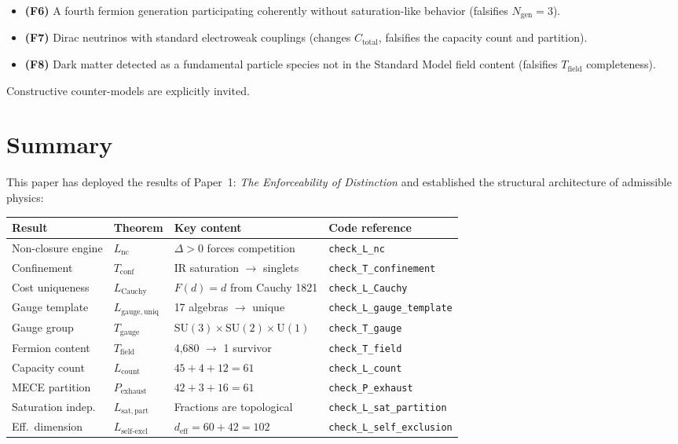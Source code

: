 \documentclass[11pt]{article}
\newenvironment{varlist}{\begin{itemize}[nosep,leftmargin=2em]}{\end{itemize}}
\newcommand{\SU}{\mathrm{SU}}
\newcommand{\U}{\mathrm{U}}
\begin{document}
\begin{varlist}
\item \textbf{(F6)} A fourth fermion generation participating coherently without saturation-like behavior (falsifies $N_{\mathrm{gen}} = 3$).
\item \textbf{(F7)} Dirac neutrinos with standard electroweak couplings (changes $C_{\mathrm{total}}$, falsifies the capacity count and partition).
\item \textbf{(F8)} Dark matter detected as a fundamental particle species not in the Standard Model field content (falsifies $T_{\mathrm{field}}$ completeness).
\end{varlist}

Constructive counter-models are explicitly invited.


\section{Summary}
\label{sec:summary}

This paper has deployed the results of Paper~1: \emph{The Enforceability of Distinction} and established the structural architecture of admissible physics:

\begin{center}
\footnotesize
\begin{tabular}{lp{2.8cm}p{4.2cm}l}
\toprule
\textbf{Result} & \textbf{Theorem} & \textbf{Key content} & \textbf{Code reference} \\
\midrule
Non-closure engine & $L_{\mathrm{nc}}$ & $\Delta > 0$ forces competition & \texttt{check\_L\_nc} \\
Confinement & $T_{\mathrm{conf}}$ & IR saturation $\to$ singlets & \texttt{check\_T\_confinement} \\
Cost uniqueness & $L_{\mathrm{Cauchy}}$ & $F(d) = d$ from Cauchy 1821 & \texttt{check\_L\_Cauchy} \\
Gauge template & $L_{\mathrm{gauge,uniq}}$ & 17 algebras $\to$ unique & \texttt{check\_L\_gauge\_template} \\
Gauge group & $T_{\mathrm{gauge}}$ & $\SU(3) \!\times\! \SU(2) \!\times\! \U(1)$ & \texttt{check\_T\_gauge} \\
Fermion content & $T_{\mathrm{field}}$ & 4{,}680 $\to$ 1 survivor & \texttt{check\_T\_field} \\
Capacity count & $L_{\mathrm{count}}$ & $45 + 4 + 12 = 61$ & \texttt{check\_L\_count} \\
MECE partition & $P_{\mathrm{exhaust}}$ & $42 + 3 + 16 = 61$ & \texttt{check\_P\_exhaust} \\
Saturation indep. & $L_{\mathrm{sat,part}}$ & Fractions are topological & \texttt{check\_L\_sat\_partition} \\
Eff.\ dimension & $L_{\mathrm{self\text{-}excl}}$ & $d_{\mathrm{eff}} = 60 + 42 = 102$ & \texttt{check\_L\_self\_exclusion} \\
\bottomrule
\end{tabular}
\end{center}
\end{document}
